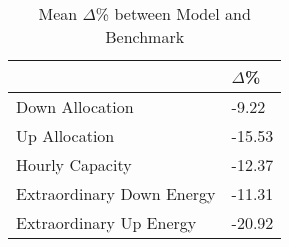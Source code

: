 \begin{table}[H] 
    \caption{Mean $\Delta$\% between Model and Benchmark\label{model_vs_bench_perc}}
    \begin{tabularx}{\textwidth}{CC}
    \toprule
    & \textbf{$\Delta$\%} \\
    

    \midrule
            Down Allocation 	        & -9.22 \\
            Up Allocation               & -15.53 \\
            Hourly Capacity 	        & -12.37 \\
            Extraordinary Down Energy 	& -11.31 \\
            Extraordinary Up Energy 	& -20.92 \\
    \bottomrule
    \end{tabularx}
\end{table}

